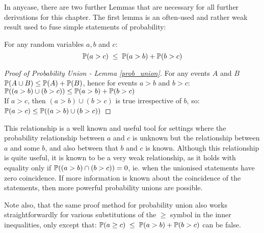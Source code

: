 In anycase, there are two further Lemmas that are necessary for all further derivations for this chapter. The first lemma is an often-used and rather weak result used to fuse simple statements of probability:
\begin{lemma}\label{prob_union}
For any random variables $a,b$ and $c$:
\[\operatorname{\mathbb{P}}(a>c) \; \le \; \operatorname{\mathbb{P}}(a>b) + \operatorname{\mathbb{P}}(b>c)\]
\end{lemma}
\begin{proof}[Proof of Probability Union - Lemma \ref{prob_union}]
For any events $A$ and $B$\\
$\operatorname{\mathbb{P}}(A\cup B) \le \operatorname{\mathbb{P}}(A)+\operatorname{\mathbb{P}}(B)$, hence for events $a>b$ and $b>c$:\\ $\operatorname{\mathbb{P}}((a>b) \cup (b>c)) \le \operatorname{\mathbb{P}}(a>b) + \operatorname{\mathbb{P}}(b>c)$\\
If $a>c$, then $(a>b) \cup (b>c)$ is true irrespective of $b$, so:\\
$\operatorname{\mathbb{P}}(a>c) \le \operatorname{\mathbb{P}}((a>b) \cup (b>c))$
\end{proof}
This relationship is a well known and useful tool for settings where the probability relationship between $a$ and $c$ is unknown but the relationship between $a$ and some $b$, and also between that $b$ and $c$ is known.
Although this relationship is quite useful, it is known to be a very weak relationship, as it holds with equality only if $\operatorname{\mathbb{P}}((a>b)\cap(b>c))=0$, ie. when the unionised statements have zero coincidence.
If more information is known about the coincidence of the statements, then more powerful probability unions are possible.

Note also, that the same proof method for probability union also works straightforwardly for various substitutions of the $\ge$ symbol in the inner inequalities, only except that: $\operatorname{\mathbb{P}}(a\ge c) \; \le \; \operatorname{\mathbb{P}}(a>b) + \operatorname{\mathbb{P}}(b>c)$ can be false.

